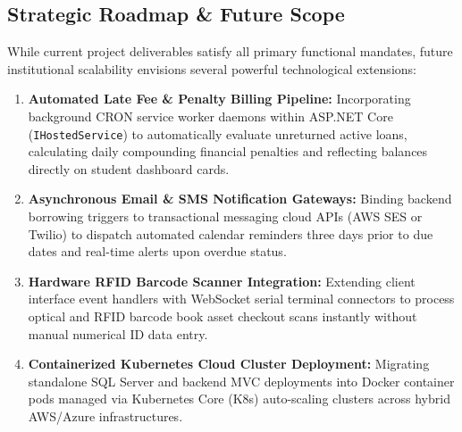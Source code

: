 \documentclass[10pt,journal,compsoc]{IEEEtran}
\begin{document}
\subsection{Strategic Roadmap \& Future Scope}
While current project deliverables satisfy all primary functional mandates, future institutional scalability envisions several powerful technological extensions:
\begin{enumerate}[leftmargin=1.5em]
    \item \textbf{Automated Late Fee \& Penalty Billing Pipeline:} Incorporating background CRON service worker daemons within ASP.NET Core (\texttt{IHostedService}) to automatically evaluate unreturned active loans, calculating daily compounding financial penalties and reflecting balances directly on student dashboard cards.
    \item \textbf{Asynchronous Email \& SMS Notification Gateways:} Binding backend borrowing triggers to transactional messaging cloud APIs (AWS SES or Twilio) to dispatch automated calendar reminders three days prior to due dates and real-time alerts upon overdue status.
    \item \textbf{Hardware RFID Barcode Scanner Integration:} Extending client interface event handlers with WebSocket serial terminal connectors to process optical and RFID barcode book asset checkout scans instantly without manual numerical ID data entry.
    \item \textbf{Containerized Kubernetes Cloud Cluster Deployment:} Migrating standalone SQL Server and backend MVC deployments into Docker container pods managed via Kubernetes Core (K8s) auto-scaling clusters across hybrid AWS/Azure infrastructures.
\end{enumerate}
\end{document}
